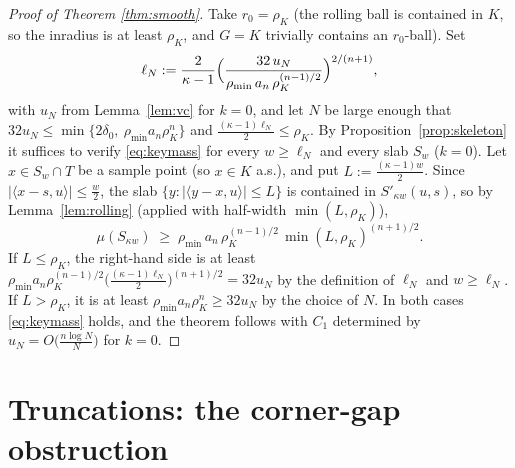 ﻿\documentclass[11pt]{article}
\begin{document}
\begin{proof}[Proof of Theorem \ref{thm:smooth}]
Take $r_0=\rho_K$ (the rolling ball is contained in $K$, so the inradius is at
least $\rho_K$, and $G=K$ trivially contains an $r_0$-ball).  Set
\[
\ell_N:=\frac{2}{\kappa-1}
\Bigl(\frac{32\,u_N}{\rho_{\min}\,a_n\,\rho_K^{(n-1)/2}}\Bigr)^{2/(n+1)},
\]
with $u_N$ from Lemma~\ref{lem:vc} for $k=0$, and let $N$ be large enough that
$32u_N\le\min\{2\delta_0,\ \rho_{\min}a_n\rho_K^{n}\}$ and
$\frac{(\kappa-1)\ell_N}{2}\le\rho_K$.  By
Proposition~\ref{prop:skeleton} it suffices to verify \eqref{eq:keymass} for
every $w\ge\ell_N$ and every slab $S_w$ ($k=0$).  Let $x\in S_w\cap T$ be a
sample point (so $x\in K$ a.s.), and put $L:=\frac{(\kappa-1)w}{2}$.  Since
$|\langle x-s,u\rangle|\le\frac w2$, the slab
$\{y:|\langle y-x,u\rangle|\le L\}$ is contained in $S'_{\kappa w}(u,s)$, so by
Lemma~\ref{lem:rolling} (applied with half-width $\min(L,\rho_K)$),
\[
\mu(S_{\kappa w})\;\ge\;\rho_{\min}\,a_n\,\rho_K^{(n-1)/2}\,
\min(L,\rho_K)^{(n+1)/2}.
\]
If $L\le\rho_K$, the right-hand side is at least
$\rho_{\min}a_n\rho_K^{(n-1)/2}\bigl(\tfrac{(\kappa-1)\ell_N}2\bigr)^{(n+1)/2}
=32u_N$ by the definition of $\ell_N$ and $w\ge\ell_N$.  If $L>\rho_K$, it is
at least $\rho_{\min}a_n\rho_K^{n}\ge32u_N$ by the choice of $N$.  In both
cases \eqref{eq:keymass} holds, and the theorem follows with
$C_1$ determined by $u_N=O\bigl(\tfrac{n\log N}{N}\bigr)$ for $k=0$.
\end{proof}

\section{Truncations: the corner-gap obstruction}\label{sec:wedge}
\end{document}
